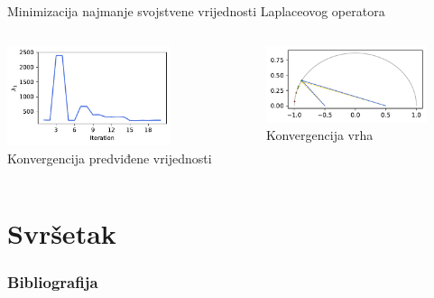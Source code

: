 \documentclass[croatian, 12pt, usepdftitle = false, xcolor = {{usenames, dvipsnames, svgnames, x11names}}, hyperref = {unicode}]{beamer}
\begin{document}
\begin{frame}{Minimizacija najmanje svojstvene vrijednosti Laplaceovog operatora}
{            \centering
            \begin{columns}
                \begin{column}{0.5\textwidth}
                    \centering
                    \includegraphics[width = 48mm]{figures/convolutional_neural_network_minimisation_values.pdf}
                    \\
                    Konvergencija predviđene vrijednosti
                \end{column}
                \begin{column}{0.5\textwidth}
                    \centering
                    \includegraphics[width = 47mm]{figures/convolutional_neural_network_minimisation_vertices.pdf}
                    \\
                    Konvergencija vrha
                \end{column}
            \end{columns}%
        }%
    \end{frame}

    \section{Svršetak}

    \begin{frame}[allowframebreaks]
        \frametitle{Bibliografija}

        \nocite{*}
        \printbibliography[heading = none]
    \end{frame}
\end{document}

